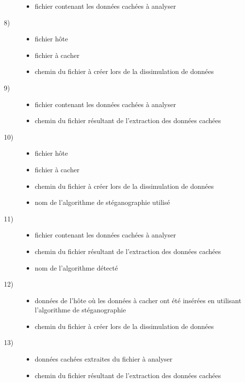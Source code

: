 \documentclass[11pt]{article}
\begin{document}
\begin{description}
\begin{itemize}
\item fichier contenant les données cachées à analyser 
\end{itemize}
\item[8)]
\begin{itemize}
\item fichier hôte
\item fichier à cacher
\item chemin du fichier à créer lors de la dissimulation de données
\end{itemize}
\item[9)]
\begin{itemize}
\item fichier contenant les données cachées à analyser 
\item chemin du fichier résultant de l'extraction des données cachées
\end{itemize}
\item[10)]
\begin{itemize}
\item fichier hôte
\item fichier à cacher
\item chemin du fichier à créer lors de la dissimulation de données
\item nom de l'algorithme de stéganographie utilisé
\end{itemize}
\item[11)]
\begin{itemize}
\item fichier contenant les données cachées à analyser 
\item chemin du fichier résultant de l'extraction des données cachées
\item nom de l'algorithme détecté
\end{itemize}
\item[12)]
\begin{itemize}
\item données de l'hôte où les données à cacher ont été insérées en utilisant l'algorithme de stéganographie
\item chemin du fichier à créer lors de la dissimulation de données
\end{itemize}
\item[13)]
\begin{itemize}
\item données cachées extraites du fichier à analyser
\item chemin du fichier résultant de l'extraction des données cachées
\end{itemize}

\end{description}
\end{document}
